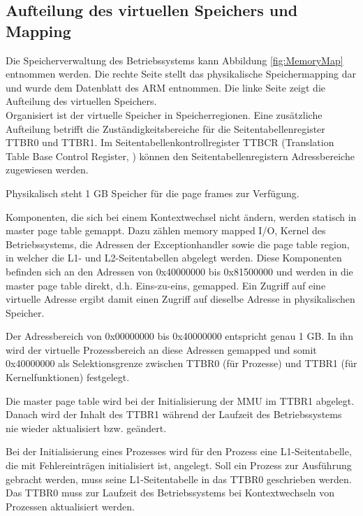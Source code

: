 \subsection{Aufteilung des virtuellen Speichers und Mapping}
\label{subsect:memoryMapping}

Die Speicherverwaltung des Betriebssystems kann Abbildung \ref{fig:MemoryMap} entnommen werden. Die rechte Seite stellt das physikalische Speichermapping dar und wurde dem Datenblatt des ARM \cite[S. 155]{ARM:TRM} entnommen. Die linke Seite zeigt die Aufteilung des virtuellen Speichers.\\

Organisiert ist der virtuelle Speicher in Speicherregionen. Eine zusätzliche Aufteilung betrifft die Zuständigkeitsbereiche für die Seitentabellenregister TTBR0 und TTBR1. Im Seitentabellenkontrollregister TTBCR (Translation Table Base Control Register, \cite[S. B4-1721]{ARM:ARM}) können den Seitentabellenregistern Adressbereiche zugewiesen werden.

Physikalisch steht 1 GB Speicher für die page frames zur Verfügung.

Komponenten, die sich bei einem Kontextwechsel nicht ändern, werden statisch in master page table gemappt. Dazu zählen memory mapped I/O, Kernel des Betriebssystems, die Adressen der Exceptionhandler sowie die page table region, in welcher die L1- und L2-Seitentabellen abgelegt werden. Diese Komponenten befinden sich an den Adressen von 0x40000000 bis 0x81500000 und werden in die master page table direkt, d.h. Eins-zu-eins, gemapped. Ein Zugriff auf eine virtuelle Adresse ergibt damit einen Zugriff auf dieselbe Adresse in physikalischen Speicher.

Der Adressbereich von 0x00000000 bis 0x40000000 entspricht genau 1 GB. In ihn wird der virtuelle Prozessbereich an diese Adressen gemapped und somit 0x40000000 als Selektionsgrenze zwischen TTBR0 (für Prozesse) und TTBR1 (für Kernelfunktionen) festgelegt.

Die master page table wird bei der Initialisierung der MMU im TTBR1 abgelegt. Danach wird der Inhalt des TTBR1 während der Laufzeit des Betriebssystems nie wieder aktualisiert bzw. geändert.

Bei der Initialisierung eines Prozesses wird für den Prozess eine L1-Seitentabelle, die mit Fehlereinträgen initialisiert ist, angelegt. Soll ein Prozess zur Ausführung gebracht werden, muss seine L1-Seitentabelle in das TTBR0 geschrieben werden. Das TTBR0 muss zur Laufzeit des Betriebssystems bei Kontextwechseln von Prozessen aktualisiert werden.





